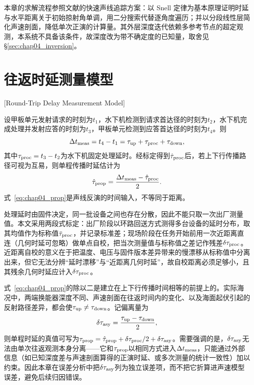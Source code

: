 本章的求解流程参照文献的快速声线追踪方案\cite{huangFastRaytracingbasedPrecise2024}：以 Snell 定律为基本原理证明时延与水平距离关于初始掠射角单调，用二分搜索代替逐角度遍历；并以分段线性层简化声速剖面，降低单次正演的计算量。其外层深度迭代依赖多参考节点的超定观测，本系统不具备该条件，故深度改为带不确定度的已知量，取舍见\S\ref{sec:chap04_inversion}。

\section{往返时延测量模型}[Round-Trip Delay Measurement Model]
\label{sec:chap04_rtt}

设甲板单元发射请求的时刻为$t_1$，水下机检测到请求首达径的时刻为$t_2$，水下机完成处理并发射应答的时刻为$t_3$，甲板单元检测到应答首达径的时刻为$t_4$。则
\begin{equation}
 \Delta t_{\rm meas}=t_4-t_1
 =\tau_{\rm up}+\tau_{\rm proc}+\tau_{\rm down},
\label{eq:chap04_rtt}
\end{equation}
其中$\tau_{\rm proc}=t_3-t_2$为水下机固定处理延时。经标定得到$\hat{\tau}_{\rm proc}$后，若上下行传播路径可视为互易，则单程传播时延估计为
\begin{equation}
 \hat{\tau}_{\rm prop}
 =\frac{\Delta t_{\rm meas}-\hat{\tau}_{\rm proc}}{2}.
\label{eq:chap04_prop}
\end{equation}
式~\eqref{eq:chap04_prop}是声线反演的时间输入，不等同于距离。

处理延时由固件决定，同一批设备之间也存在分散，因此不能只取一次出厂测量值。本文采用两段式标定：出厂阶段以环路回送方式测得多台设备的延时分布，取其均值作为标称值$\bar\tau_{\rm proc}$，并记录标准差；现场阶段在任务开始前用一次近距离直连（几何时延可忽略）做单点自校，把当次测量值与标称值之差记作残差$\delta\tau_{\rm proc}$。近距离自校的意义在于把温度、电压与固件版本差异带来的慢漂移从标称值中分离出来，但它无法分辨“延时漂移”与“近距离几何时延”，故自校距离必须足够小，且其残余几何时延应计入$\delta\tau_{\rm proc}$。

式~\eqref{eq:chap04_prop}的除以二是建立在上下行传播时间相等的前提上的。实际海况中，两端换能器深度不同、声速剖面在往返时间内的变化、以及海面起伏引起的反射路径差异，都会使$\tau_{\rm up}\ne\tau_{\rm down}$。记偏离量为
\begin{equation}
 \delta\tau_{\rm asy}=\frac{\tau_{\rm up}-\tau_{\rm down}}{2},
\label{eq:chap04_asym}
\end{equation}
则单程时延的真值可写为$\tau_{\rm prop}=\hat{\tau}_{\rm prop}+\delta\tau_{\rm proc}/2+\delta\tau_{\rm asy}$。需要强调的是，$\delta\tau_{\rm asy}$无法由单次往返观测本身分离——它和$\tau_{\rm prop}$以相同方式进入$\Delta t_{\rm meas}$，只能通过外部信息（如已知深度差与声速剖面算得的正演时延、或多次测量的统计一致性）加以约束。因此本章在误差分析中把$\delta\tau_{\rm asy}$列为独立误差项，而不把它折算进声速模型误差，避免后续归因错误。

